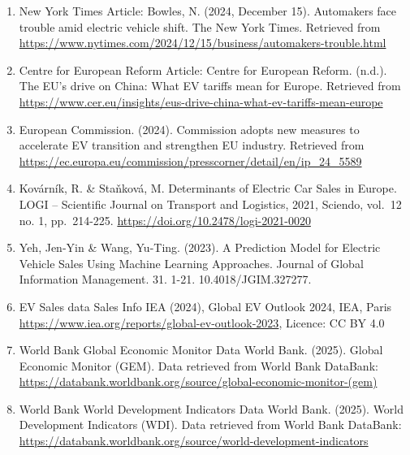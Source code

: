 \documentclass[
]{article}
\begin{document}
\begin{enumerate}
\def\labelenumi{\arabic{enumi}.}
\item
  New York Times Article: Bowles, N. (2024, December 15). Automakers
  face trouble amid electric vehicle shift. The New York Times.
  Retrieved from
  \url{https://www.nytimes.com/2024/12/15/business/automakers-trouble.html}
\item
  Centre for European Reform Article: Centre for European Reform.
  (n.d.). The EU's drive on China: What EV tariffs mean for Europe.
  Retrieved from
  \url{https://www.cer.eu/insights/eus-drive-china-what-ev-tariffs-mean-europe}
\item
  European Commission. (2024). Commission adopts new measures to
  accelerate EV transition and strengthen EU industry. Retrieved from
  \url{https://ec.europa.eu/commission/presscorner/detail/en/ip_24_5589}
\item
  Kovárník, R. \& Staňková, M. Determinants of Electric Car Sales in
  Europe. LOGI -- Scientific Journal on Transport and Logistics, 2021,
  Sciendo, vol.~12 no. 1, pp.~214-225.
  \url{https://doi.org/10.2478/logi-2021-0020}
\item
  Yeh, Jen-Yin \& Wang, Yu-Ting. (2023). A Prediction Model for Electric
  Vehicle Sales Using Machine Learning Approaches. Journal of Global
  Information Management. 31. 1-21. 10.4018/JGIM.327277.
\item
  EV Sales data Sales Info IEA (2024), Global EV Outlook 2024, IEA,
  Paris \url{https://www.iea.org/reports/global-ev-outlook-2023},
  Licence: CC BY 4.0
\item
  World Bank Global Economic Monitor Data World Bank. (2025). Global
  Economic Monitor (GEM). Data retrieved from World Bank DataBank:
  \url{https://databank.worldbank.org/source/global-economic-monitor-(gem)}
\item
  World Bank World Development Indicators Data World Bank. (2025). World
  Development Indicators (WDI). Data retrieved from World Bank DataBank:
  \href{https://databank.worldbank.org/source/global-economic-monitor-(gem)}{https://databank.worldbank.org/source/}\href{https://databank.worldbank.org/source/world-development-indicators}{world-development-indicators}
\end{enumerate}
\end{document}
